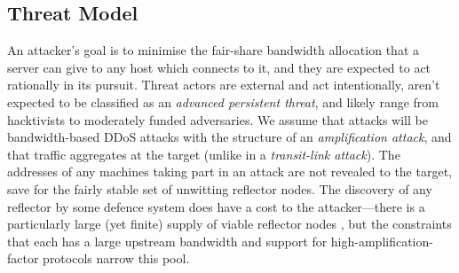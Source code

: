 \documentclass[conference, letterpaper, 10pt, times]{IEEEtran}
\begin{document}
%

\subsection{Threat Model}


An attacker's goal is to minimise the fair-share bandwidth allocation that a server can give to any host which connects to it, and they are expected to act rationally in its pursuit.
Threat actors are external and act intentionally, aren't expected to be classified as an \emph{advanced persistent threat}, and likely range from hacktivists to moderately funded adversaries.
We assume that attacks will be bandwidth-based DDoS attacks with the structure of an \emph{amplification attack}, and that traffic aggregates at the target (unlike in a \emph{transit-link attack}).
The addresses of any machines taking part in an attack are not revealed to the target, save for the fairly stable set of unwitting reflector nodes.
The discovery of any reflector by some defence system does have a cost to the attacker---there is a particularly large (yet finite) supply of viable reflector nodes \cite{DBLP:conf/ndss/Rossow14}, but the constraints that each has a large upstream bandwidth and support for high-amplification-factor protocols narrow this pool.
\end{document}
